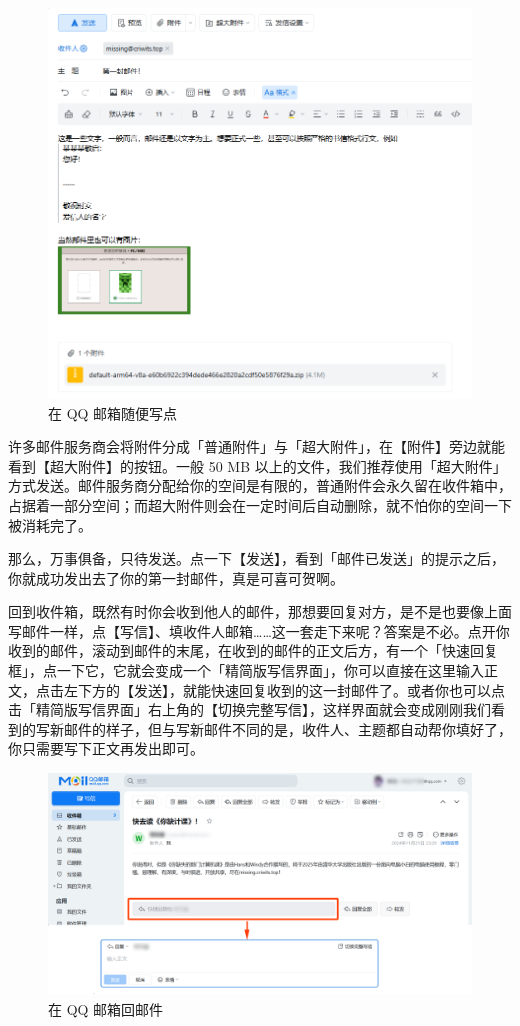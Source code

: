 \begin{figure}[htb!]
  \centering
  \includegraphics[width=.83\textwidth]{assets/software/QQ_Mail_Writing_2.png}
  \caption{在 QQ 邮箱随便写点}
  \label{fig:QQ_Mail_Writing_2}
\end{figure}

\begin{note}
  许多邮件服务商会将附件分成「普通附件」与「超大附件」，在【附件】旁边就能看到【超大附件】的按钮。一般 50 MB 以上的文件，我们推荐使用「超大附件」方式发送。邮件服务商分配给你的空间是有限的，普通附件会永久留在收件箱中，占据着一部分空间；而超大附件则会在一定时间后自动删除，就不怕你的空间一下被消耗完了。
\end{note}

那么，万事俱备，只待发送。点一下【发送】，看到「邮件已发送」的提示之后，你就成功发出去了你的第一封邮件，真是可喜可贺啊。

回到收件箱，既然有时你会收到他人的邮件，那想要回复对方，是不是也要像上面写邮件一样，点【写信】、填收件人邮箱……这一套走下来呢？答案是不必。点开你收到的邮件，滚动到邮件的末尾，在收到的邮件的正文后方，有一个「快速回复框」，点一下它，它就会变成一个「精简版写信界面」，你可以直接在这里输入正文，点击左下方的【发送】，就能快速回复收到的这一封邮件了。或者你也可以点击「精简版写信界面」右上角的【切换完整写信】，这样界面就会变成刚刚我们看到的写新邮件的样子，但与写新邮件不同的是，收件人、主题都自动帮你填好了，你只需要写下正文再发出即可。

\begin{figure}[htb!]
  \centering
  \includegraphics[width=.85\textwidth]{assets/software/QQ_Mail_Reply.png}
  \caption{在 QQ 邮箱回邮件}
  \label{fig:QQ_Mail_Reply}
\end{figure}

